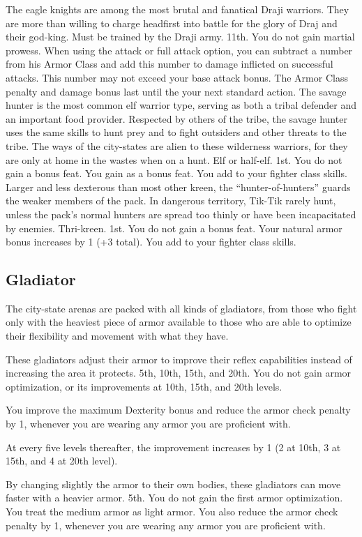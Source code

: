 {The eagle knights are among the most brutal and fanatical Draji warriors. They are more than willing to charge headfirst into battle for the glory of Draj and their god-king.}
{Must be trained by the Draji army.}
{11th.}
{You do not gain martial prowess.}
{
	When using the attack or full attack option, you can subtract a number from his Armor Class and add this number to damage inflicted on successful attacks. This number may not exceed your base attack bonus. The Armor Class penalty and damage bonus last until the your next standard action.
}
{The savage hunter is the most common elf warrior type, serving as both a tribal defender and an important food provider. Respected by others of the tribe, the savage hunter uses the same skills to hunt prey and to fight outsiders and other threats to the tribe. The ways of the city-states are alien to these wilderness warriors, for they are only at home in the wastes when on a hunt.}
{Elf or half-elf.}
{1st.}
{You do not gain a bonus feat.}
{
	You gain  as a bonus feat. You add  to your fighter class skills.
}
{Larger and less dexterous than most other kreen, the ``hunter-of-hunters'' guards the weaker members of the pack. In dangerous territory, Tik-Tik rarely hunt, unless the pack's normal hunters are spread too thinly or have been incapacitated by enemies.}
{Thri-kreen.}
{1st.}
{You do not gain a bonus feat.}
{
	Your natural armor bonus increases by 1 (+3 total). You add  to your fighter class skills.
}


\subsection{Gladiator}
The city-state arenas are packed with all kinds of gladiators, from those who fight only with the heaviest piece of armor available to those who are able to optimize their flexibility and movement with what they have.

{These gladiators adjust their armor to improve their reflex capabilities instead of increasing the area it protects.}
{}
{5th, 10th, 15th, and 20th.}
{You do not gain armor optimization, or its improvements at 10th, 15th, and 20th levels.}
{
	You improve the maximum Dexterity bonus and reduce the armor check penalty by 1, whenever you are wearing any armor you are proficient with.

	At every five levels thereafter, the improvement increases by 1 (2 at 10th, 3 at 15th, and 4 at 20th level).
}
{By changing slightly the armor to their own bodies, these gladiators can move faster with a heavier armor.}
{}
{5th.}
{You do not gain the first armor optimization.}
{
	You treat the medium armor as light armor. You also reduce the armor check penalty by 1, whenever you are wearing any armor you are proficient with.
}


